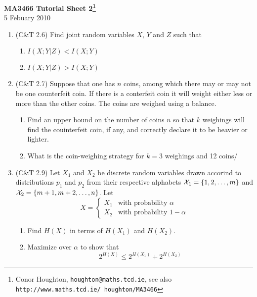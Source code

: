\documentclass[12pt]{article}
\begin{document}
\begin{center}
{\bf MA3466 Tutorial Sheet 2\footnote{Conor Houghton, {\tt houghton@maths.tcd.ie}, see also {\tt http://www.maths.tcd.ie/ houghton/MA3466}}}\\[1cm]{} 5 Febuary 2010
\end{center}
\begin{enumerate}

\item (C\&T 2.6) Find joint random variables $X$, $Y$ and $Z$ such that 
\begin{enumerate}
\item $I(X;Y|Z)<I(X;Y)$
\item $I(X;Y|Z)>I(X;Y)$
\end{enumerate}

\item (C\&T 2.7) Suppose that one has $n$ coins, among which there may or may not be one counterfeit coin. If there is a conterfeit coin it will weight either less or more than the other coins. The coins are weighed using a balance.
\begin{enumerate}
\item Find an upper bound on the number of coins $n$ so that $k$ weighings will find the couinterfeit coin, if any, and correctly declare it to be heavier or lighter.
\item What is the coin-weighing strategy for $k=3$ weighings and 12 coins/
\end{enumerate}

\item (C\&T 2.9) Let $X_1$ and $X_2$ be discrete random variables drawn accorind to distributions $p_1$ and $p_2$ from their respective alphabets ${\cal X}_1=\{1,2,\ldots,m\}$ and  ${\cal X}_2=\{m+1,m+2,\ldots,n\}$. Let
\begin{equation}
X=\left\{\begin{array}{ll}
X_1&\mbox{with probability $\alpha$}\\
X_2&\mbox{with probability $1-\alpha$}
\end{array}\right.
\end{equation}
\begin{enumerate}
\item Find $H(X)$ in terms of $H(X_1)$ and $H(X_2)$.
\item Maximize over $\alpha$ to show that 
\begin{equation}
2^{H(X)}\le 2^{H(X_1)}+2^{H(X_2)}
\end{equation}
\end{enumerate}


\end{enumerate}
\end{document}
